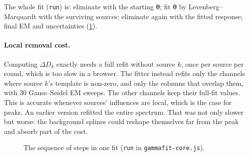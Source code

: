 \documentclass[11pt]{article}
\newcommand{\vth}{\bm{\theta}}
\newcommand{\vx}{\bm{x}}
\newcommand{\code}[1]{\texttt{#1}}
\begin{document}
The whole fit (\code{run}) is: eliminate with the starting $\vth$; fit $\vth$ by Levenberg--Marquardt with the surviving sources; eliminate again with the fitted response; final EM and uncertainties (\cref{fig:flow}).

\paragraph{Local removal cost.} Computing $\Delta D_k$ exactly needs a full refit without source $k$, once per source per round, which is too slow in a browser. The fitter instead refits only the channels where source $k$'s template is non-zero, and only the columns that overlap them, with 30 Gauss--Seidel EM sweeps. The other channels keep their full-fit values. This is accurate whenever sources' influences are local, which is the case for peaks. An earlier version refitted the entire spectrum. That was not only slower but worse: the background splines could reshape themselves far from the peak and absorb part of the cost.

\begin{figure}[tbp]
\centering
{}
\caption{The sequence of steps in one fit (\code{run} in \code{gammafit-core.js}).}\label{fig:flow}
\end{figure}
\end{document}
